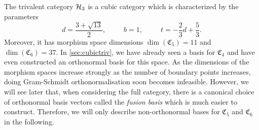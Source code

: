 	The trivalent category ${\mathcal{H}_3}$ is a cubic category which is characterized by the parameters
		\begin{equation}
			d=\frac{3+\sqrt{13}}{2},\hspace{30pt}b=1,\hspace{30pt}t=-\frac{2}{3}d+\frac{5}{3}.
		\end{equation} 
	Moreover, it has morphism space dimensions $\dim(\mathfrak{C}_5)=11$ and $\dim(\mathfrak{C}_6)=37$. In \cref{sec:cubictriv}, we have already seen a basis for $\mathfrak{C}_4$ and have even constructed an orthonormal basis for this space. As the dimensions of the morphism spaces increase strongly as the number of boundary points increases, doing Gram-Schmidt orthonormalisation soon becomes infeasible. However, we will see later that, when considering the full category, there is a canonical choice of orthonormal basis vectors called the \emph{fusion basis} which is much easier to construct. Therefore, we will only describe non-orthonormal bases for $\mathfrak{C}_5$ and $\mathfrak{C}_6$ in the following.
	
